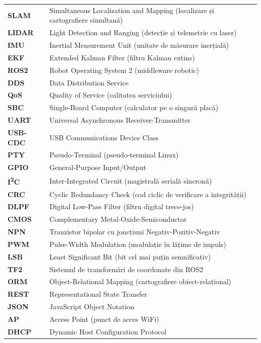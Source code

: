 \documentclass[a4paper,12pt,twoside,openany]{report}
\begin{document}
\begin{longtable}{@{}>{\bfseries}p{2.8cm} p{\dimexpr\textwidth-3.2cm\relax}@{}}
SLAM      & Simultaneous Localization and Mapping (localizare și cartografiere simultană) \\
LIDAR     & Light Detection and Ranging (detecție și telemetrie cu laser) \\
IMU       & Inertial Measurement Unit (unitate de măsurare inerțială) \\
EKF       & Extended Kalman Filter (filtru Kalman extins) \\
ROS2      & Robot Operating System 2 (middleware robotic) \\
DDS       & Data Distribution Service \\
QoS       & Quality of Service (calitatea serviciului) \\
SBC       & Single-Board Computer (calculator pe o singură placă) \\
UART      & Universal Asynchronous Receiver-Transmitter \\
USB-CDC   & USB Communications Device Class \\
PTY       & Pseudo-Terminal (pseudo-terminal Linux) \\
GPIO      & General-Purpose Input/Output \\
I\textsuperscript{2}C & Inter-Integrated Circuit (magistrală serială sincronă) \\
CRC       & Cyclic Redundancy Check (cod ciclic de verificare a integrității) \\
DLPF      & Digital Low-Pass Filter (filtru digital trece-jos) \\
CMOS      & Complementary Metal-Oxide-Semiconductor \\
NPN       & Tranzistor bipolar cu joncțiuni Negativ-Pozitiv-Negativ \\
PWM       & Pulse-Width Modulation (modulație în lățime de impuls) \\
LSB       & Least Significant Bit (bit cel mai puțin semnificativ) \\
TF2       & Sistemul de transformări de coordonate din ROS2 \\
ORM       & Object-Relational Mapping (cartografiere obiect-relațional) \\
REST      & Representational State Transfer \\
JSON      & JavaScript Object Notation \\
AP        & Access Point (punct de acces WiFi) \\
DHCP      & Dynamic Host Configuration Protocol \\

\end{longtable}
\end{document}
